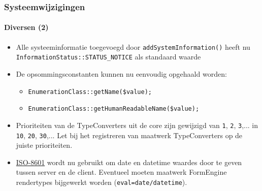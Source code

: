 \begin{frame}[fragile]
	\frametitle{Systeemwijzigingen}
	\framesubtitle{Diversen (2)}


	\begin{itemize}
		\item Alle systeeminformatie toegevoegd door \texttt{addSystemInformation()} heeft nu
			\texttt{InformationStatus::STATUS\_NOTICE} als standaard waarde
		\item De opsommingsconstanten kunnen nu eenvoudig opgehaald worden:

			\begin{itemize}
				\item \texttt{EnumerationClass::getName(\$value);}
				\item \texttt{EnumerationClass::getHumanReadableName(\$value);}
			\end{itemize}

		\item Prioriteiten van de TypeConverters uit de core zijn gewijzigd van \newline
			\texttt{1}, \texttt{2}, \texttt{3},... in \texttt{10}, \texttt{20}, \texttt{30},...
			Let bij het registreren van maatwerk TypeConverters op de juiste prioriteiten.

		\item \href{https://en.wikipedia.org/wiki/ISO_8601}{ISO-8601} wordt nu gebruikt om date en datetime
			waardes door te geven tussen server en de client. Eventueel moeten maatwerk FormEngine rendertypes
			bijgewerkt worden (\texttt{eval=date/datetime}).

	\end{itemize}

\end{frame}

